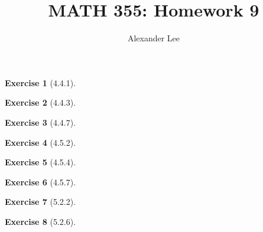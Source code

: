 \documentclass{amsart}
\title{MATH 355: Homework 9}
\author{Alexander Lee}
\theoremstyle{definition}
\newtheorem{exercise}{Exercise}
\begin{document}
\maketitle

\begin{exercise}[4.4.1]
\end{exercise}

\begin{exercise}[4.4.3]
\end{exercise}

\begin{exercise}[4.4.7]
\end{exercise}

\begin{exercise}[4.5.2]
\end{exercise}

\begin{exercise}[4.5.4]
\end{exercise}

\begin{exercise}[4.5.7]
\end{exercise}

\begin{exercise}[5.2.2]
\end{exercise}

\begin{exercise}[5.2.6]
\end{exercise}
\end{document}
